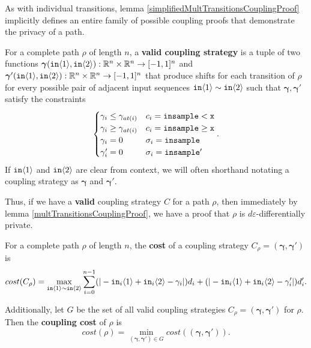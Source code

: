 As with individual transitions, lemma \ref{simplifiedMultTransitionsCouplingProof} implicitly defines an entire family of possible coupling proofs that demonstrate the privacy of a path.

\begin{defn}
    For a complete path $\rho$ of length $n$, a \textbf{valid coupling strategy} is a tuple of two functions $\bm{\gamma}(\texttt{in}\brangle{1}, \texttt{in}\brangle{2}):\RR^n\times \RR^n\to [-1, 1]^n$ and $\bm{\gamma}'(\texttt{in}\brangle{1}, \texttt{in}\brangle{2}):\RR^n\times \RR^n\to [-1, 1]^n$ 
    that produce shifts for each transition of $\rho$ for every possible pair of adjacent input sequences $\texttt{in}\brangle{1}\sim\texttt{in}\brangle{2}$ such that $\bm{\gamma}, \bm{\gamma'}$ satisfy the constraints \[
      \begin{cases}
        \gamma_i\leq\gamma_{at(i)} & c_i = \lguard[\texttt{x}]\\
        \gamma_i\geq\gamma_{at(i)} & c_i = \gguard[\texttt{x}]\\
        \gamma_i=0 & \sigma_i = \texttt{insample}\\
        \gamma_i'=0 & \sigma_i = \texttt{insample}'
      \end{cases}.
    \]
    If $\texttt{in}\brangle{1}$ and $\texttt{in}\brangle{2}$ are clear from context, we will often shorthand notating a coupling strategy as $\bm{\gamma}$ and $\bm{\gamma}'$. 
\end{defn}

Thus, if we have a \textbf{valid} coupling strategy $C$ for a path $\rho$, then immediately by lemma \ref{multTransitionsCouplingProof}, we have a proof that $\rho$ is $d\varepsilon$-differentially private. 

\begin{defn}
    For a complete path $\rho$ of length $n$, the \textbf{cost} of a coupling strategy $C_\rho=(\bm{\gamma}, \bm{\gamma}')$ is \[cost(C_\rho) = \max_{\texttt{in}\brangle{1}\sim\texttt{in}\brangle{2}}\sum_{i=0}^{n-1}(|-\texttt{in}_i\brangle{1}+\texttt{in}_i\brangle{2}-\gamma_i|)d_i+(|-\texttt{in}_i\brangle{1}+\texttt{in}_i\brangle{2}-\gamma_i'|)d_i'.\]

    Additionally, let $G$ be the set of all valid coupling strategies $C_\rho=(\bm{\gamma}, \bm{\gamma}')$ for $\rho$. Then the \textbf{coupling cost} of $\rho$ is 
    \[cost(\rho) = \min_{(\bm{\gamma}, \bm{\gamma}')\in G}cost((\bm{\gamma}, \bm{\gamma}')).\]
\end{defn}

